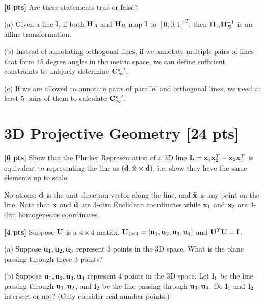 \documentclass[11pt,addpoints,answers]{exam}
\numberwithin{equation}{section} %
\numberwithin{figure}{section} %
\numberwithin{table}{section} %
\begin{document}
\begin{questions}
\question \textbf{[6 pts]} Are these statements true or false?


(a) Given a line $\mathbf{l}$, if both $\mathbf{H}_A$ and $\mathbf{H}_B$ map $\mathbf{l}$ to $[0,0,1]^T$, then $\mathbf{H}_A\mathbf{H}_B^{-1}$ is an affine transformation. 

(b) Instead of annotating orthogonal lines, if we annotate multiple pairs of lines that form 45 degree angles in the metric space, we can define sufficient constraints to uniquely determine $\mathbf{C}_\infty^{\star}{}'$.

(c) If we are allowed to annotate pairs of parallel and orthogonal lines, we need at least 5 pairs of them to calculate $\mathbf{C}_\infty^{\star}{}'$.

\begin{tcolorbox}[fit,height=5cm, width=\textwidth, blank, borderline={0.5pt}{-2pt},halign=left, valign=center, nobeforeafter]



\end{tcolorbox}


\section{3D Projective Geometry [24 pts]}

\question \textbf{[6 pts]} Show that the Plucker Representation of a 3D line $\mathbf{L} = \mathbf{x}_1\mathbf{x}_2^T - \mathbf{x}_2\mathbf{x}_1^T$ is equivalent to representing the line as $(\tilde {\mathbf{d}}, \tilde {\mathbf{x}} \times \tilde {\mathbf{d}})$, i.e. show they have the same elements up to scale.

Notations: $\tilde{\mathbf{d}}$ is the unit direction vector along the line, and $\tilde {\mathbf{x}}$ is any point on the line. Note that $\tilde{\mathbf{x}}$ and $\tilde{\mathbf{d}}$ are 3-dim Euclidean coordinates while $\mathbf{x}_1$ and $\mathbf{x}_2$ are 4-dim homogeneous coordinates.

\begin{tcolorbox}[fit,height=10cm, width=\textwidth, blank, borderline={0.5pt}{-2pt},halign=left, valign=center, nobeforeafter]


\end{tcolorbox}

\question \textbf{[4 pts]} Suppose $\mathbf{U}$ is a $4\times 4$ matrix. $\mathbf{U}_{4 \times 4} = [\mathbf{u}_1, \mathbf{u}_2, \mathbf{u}_3, \mathbf{u}_4]$ and $\mathbf{U}^T\mathbf{U} = \mathbf{I}$.

(a) Suppose $\mathbf{u}_1, \mathbf{u}_2, \mathbf{u}_3$ represent 3 points in the 3D space. What is the plane passing through these 3 points?

(b) Suppose $\mathbf{u}_1, \mathbf{u}_2, \mathbf{u}_3, \mathbf{u}_4$ represent 4 points in the 3D space. Let $\mathbf{l}_1$ be the line passing through $\mathbf{u}_1, \mathbf{u}_2$, and $\mathbf{l}_2$ be the line passing through $\mathbf{u}_3, \mathbf{u}_4$. Do $\mathbf{l}_1$ and $\mathbf{l}_2$ intersect or not? (Only consider real-number points.)


\end{questions}
\end{document}
